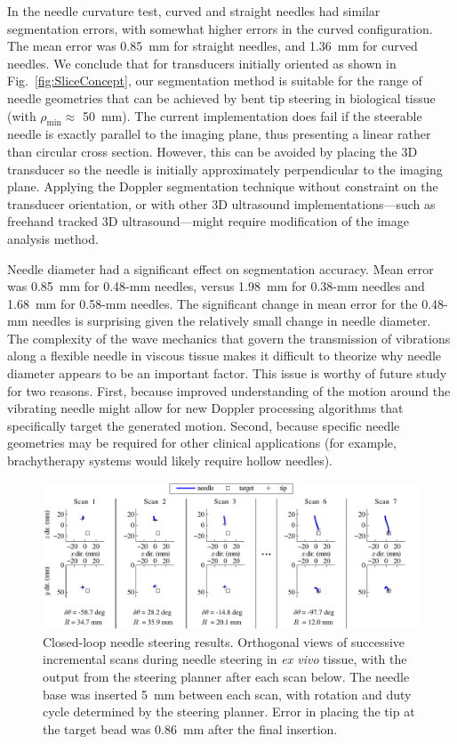 In the needle curvature test, curved and straight needles had similar segmentation errors, with somewhat higher errors in the curved configuration. The mean error was 0.85~mm for straight needles, and 1.36~mm for curved needles. We conclude that for transducers initially oriented as shown in Fig.~\ref{fig:SliceConcept}, our segmentation method is suitable for the range of needle geometries that can be achieved by bent tip steering in biological tissue (with $\rho_{\text{min}} \approx$ 50~mm). The current implementation does fail if the steerable needle is exactly parallel to the imaging plane, thus presenting a linear rather than circular cross section. However, this can be avoided by placing the 3D transducer so the needle is initially approximately perpendicular to the imaging plane. Applying the Doppler segmentation technique without constraint on the transducer orientation, or with other 3D ultrasound implementations---such as freehand tracked 3D ultrasound---might require modification of the image analysis method.

Needle diameter had a significant effect on segmentation accuracy. Mean error was 0.85~mm for 0.48-mm needles, versus 1.98~mm for 0.38-mm needles and 1.68~mm for 0.58-mm needles. The significant change in mean error for the 0.48-mm needles is surprising given the relatively small change in needle diameter. The complexity of the wave mechanics that govern the transmission of vibrations along a flexible needle in viscous tissue makes it difficult to theorize why needle diameter appears to be an important factor. This issue is worthy of future study for two reasons. First, because improved understanding of the motion around the vibrating needle might allow for new Doppler processing algorithms that specifically target the generated motion. Second, because specific needle geometries may be required for other clinical applications (for example, brachytherapy systems would likely require hollow needles).

\begin{figure}[!ht]
\centering
\includegraphics[width = \textwidth]{Images/Chapter2/Steering/Steering}%
\caption[Closed-loop needle steering results]{Closed-loop needle steering results. Orthogonal views of successive incremental scans during needle steering in \textit{ex vivo} tissue, with the output from the steering planner after each scan below. The needle base was inserted 5~mm between each scan, with rotation and duty cycle determined by the steering planner. Error in placing the tip at the target bead was 0.86~mm after the final insertion.}
\label{fig:SucessfulSteering}
\end{figure}

